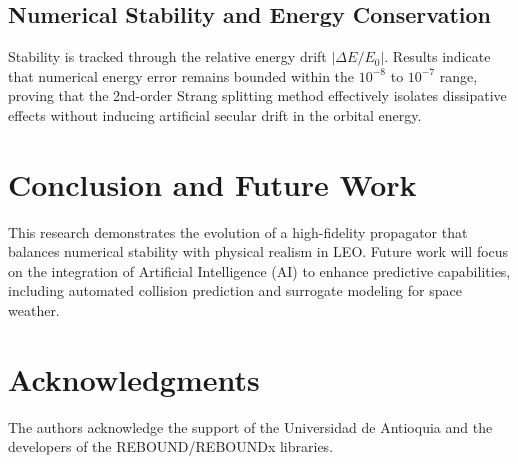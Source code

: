 \documentclass[letterpaper, paper,11pt]{AAS}
\begin{document}
\subsection{Numerical Stability and Energy Conservation}
Stability is tracked through the relative energy drift $|\Delta E / E_0|$. Results indicate that numerical energy error remains bounded within the $10^{-8}$ to $10^{-7}$ range, proving that the 2nd-order Strang splitting method effectively isolates dissipative effects without inducing artificial secular drift in the orbital energy\cite{sanz-serna_symplectic_1992}.

\section{Conclusion and Future Work}
This research demonstrates the evolution of a high-fidelity propagator that balances numerical stability with physical realism in LEO. Future work will focus on the integration of Artificial Intelligence (AI) to enhance predictive capabilities, including automated collision prediction and surrogate modeling for space weather.

\section*{Acknowledgments}
The authors acknowledge the support of the Universidad de Antioquia and the developers of the REBOUND/REBOUNDx libraries\cite{rein_rebound_2012, tamayo_reboundx_2020}.



\end{document}
